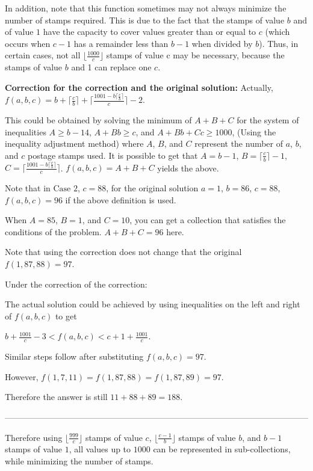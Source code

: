 \begin{enumerate}
 In addition, note that this function sometimes may not always minimize the number of stamps required. This is due to the fact that the stamps of value $b$ and of value $1$ have the capacity to cover values greater than or equal to $c$ (which occurs when $c-1$ has a remainder less than $b-1$ when divided by $b$). Thus, in certain cases, not all $\lfloor \frac{1000}{c} \rfloor$ stamps of value c may be necessary, because the stamps of value $b$ and 1 can replace one $c$.

 


 \textbf{Correction for the correction and the original solution:} Actually, $f(a, b, c) = b + \lceil \frac{c}{b} \rceil + \lceil \frac{1001-b \lceil \frac{c}{b} \rceil}{c} \rceil - 2$.

 This could be obtained by solving the minimum of $A+B+C$ for the system of inequalities $A \geq b-14$, $A+Bb \geq c$, and $A+Bb+Cc \geq 1000$, (Using the inequality adjustment method) where $A$, $B$, and $C$ represent the number of $a$, $b$, and $c$ postage stamps used. It is possible to get that $A=b-1$, $B=\lceil \frac{c}{b} \rceil-1$, $C=\lceil \frac{1001-b \lceil \frac{c}{b} \rceil}{c} \rceil$. $f(a,b,c)=A+B+C$ yields the above.

 Note that in $\text{Case } 2$, $c=88$, for the original solution $a=1$, $b=86$, $c=88$, $f(a,b,c)=96$ if the above definition is used.

 When $A=85$, $B=1$, and $C=10$, you can get a collection that satisfies the conditions of the problem. $A+B+C=96$ here.

 Note that using the correction does not change that the original $f(1,87,88)=97$.

 Under the correction of the correction:

 The actual solution could be achieved by using inequalities on the left and right of $f(a,b,c)$ to get

 $b+\frac{1001}{c}-3<f(a,b,c)<c+1+\frac{1001}{c}$.

 Similar steps follow after substituting $f(a,b,c)=97$.

 However, $f(1,7,11)=f(1,87,88)=f(1,87,89)=97$.

 Therefore the answer is still $11+88+89=\boxed{188}$.

 ————————————————————————————————————

 
Therefore using $\lfloor \frac{999}{c} \rfloor$ stamps of value $c$, $\lfloor \frac{c-1}{b} \rfloor$ stamps of value $b$, and $b-1$ stamps of value $1$, all values up to $1000$ can be represented in sub-collections, while minimizing the number of stamps.


\end{enumerate}
